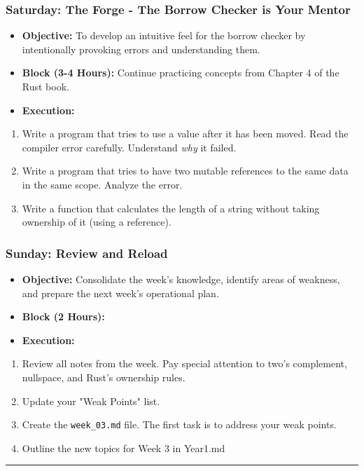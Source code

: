 \documentclass[11pt,a4paper]{report}
\begin{document}
\subsubsection{\textbf{Saturday: The Forge - The Borrow Checker is Your Mentor}}
\begin{itemize}
  \item \textbf{Objective:} To develop an intuitive feel for the borrow checker by intentionally provoking errors and understanding them.
  \item \textbf{Block (3-4 Hours):} Continue practicing concepts from Chapter 4 of the Rust book.
  \item \textbf{Execution:}
\end{itemize}
\begin{enumerate}
  \item Write a program that tries to use a value after it has been moved. Read the compiler error carefully. Understand \textit{why} it failed.
  \item Write a program that tries to have two mutable references to the same data in the same scope. Analyze the error.
  \item Write a function that calculates the length of a string without taking ownership of it (using a reference).

\end{enumerate}
\subsubsection{\textbf{Sunday: Review and Reload}}
\begin{itemize}
  \item \textbf{Objective:} Consolidate the week's knowledge, identify areas of weakness, and prepare the next week's operational plan.
  \item \textbf{Block (2 Hours):}
  \item \textbf{Execution:}
\end{itemize}
\begin{enumerate}
  \item Review all notes from the week. Pay special attention to two's complement, nullspace, and Rust's ownership rules.
  \item Update your "Weak Points" list.
  \item Create the \texttt{week\_03.md} file. The first task is to address your weak points.
  \item Outline the new topics for Week 3 in Year1.md

\end{enumerate}
\noindent\rule{\textwidth}{0.4pt}
\end{document}
